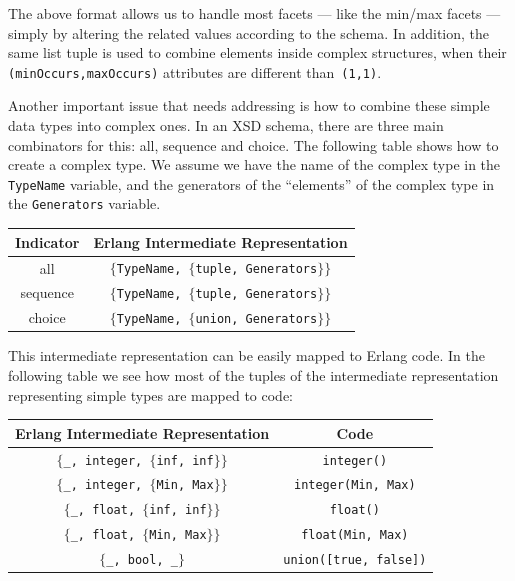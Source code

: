 \documentclass[copyright]{eptcs}
\begin{document}
The above format allows us to handle most facets --- like the min/max facets ---
simply by altering the related values according to the schema. In addition, the
same list tuple is used to combine elements inside complex structures, when
their \texttt{(minOccurs,maxOccurs)} attributes are different than~\texttt{(1,1)}.

Another important issue that needs addressing is how to combine these
simple data types into complex ones. In an XSD schema, there are three
main combinators for this: all, sequence and choice. The following
table shows how to create a complex type. We assume we have the name
of the complex type in the \texttt{TypeName} variable, and the
generators of the ``elements'' of the complex type in the
\texttt{Generators} variable.

\begin{center}\footnotesize
  \begin{tabular}{cc}
    \toprule
    Indicator & Erlang Intermediate Representation \\
    \midrule
    all & \texttt{$\{$TypeName, $\{$tuple, Generators$\}\}$}\\
    sequence & \texttt{$\{$TypeName, $\{$tuple, Generators$\}\}$}\\
    choice & \texttt{$\{$TypeName, $\{$union, Generators$\}\}$}\\
    \bottomrule
  \end{tabular}
\end{center}

This intermediate representation can be easily mapped to Erlang code.
In the following table we see how most of the tuples of the
intermediate representation representing simple types are mapped to
code:
\begin{center}\footnotesize
  \begin{tabular}{cc}
    \toprule
    Erlang Intermediate Representation & Code\\
    \midrule
    \texttt{$\{$\_, integer, $\{$inf, inf$\}\}$} & \texttt{integer()}\\
    \texttt{$\{$\_, integer, $\{$Min, Max$\}\}$} & \texttt{integer(Min, Max)}\\
    \texttt{$\{$\_, float, $\{$inf, inf$\}\}$} & \texttt{float()}\\
    \texttt{$\{$\_, float, $\{$Min, Max$\}\}$} & \texttt{float(Min, Max)}\\
    \texttt{$\{$\_, bool, \_$\}$} & \texttt{union([true, false])}\\
    \bottomrule
  \end{tabular}
\end{center}
\end{document}
